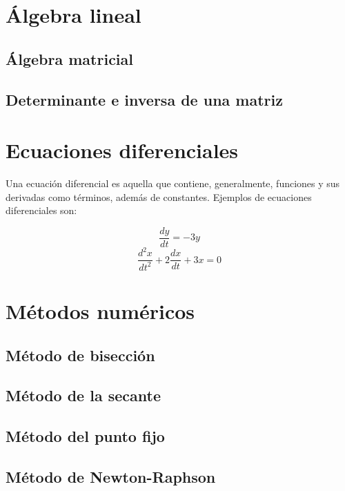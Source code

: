 \section{Álgebra lineal}

\subsection{Álgebra matricial}



\subsection{Determinante e inversa de una matriz}



\section{Ecuaciones diferenciales}

Una ecuación diferencial es aquella que contiene, generalmente, funciones y sus derivadas como 
términos, además de constantes. Ejemplos de ecuaciones diferenciales son:

$$\frac{dy}{dt}=-3y$$
$$\frac{d^2x}{dt^2}+2\frac{dx}{dt}+3x=0$$



\section{Métodos numéricos}

\subsection{Método de bisección}

\subsection{Método de la secante}

\subsection{Método del punto fijo}

\subsection{Método de Newton-Raphson}